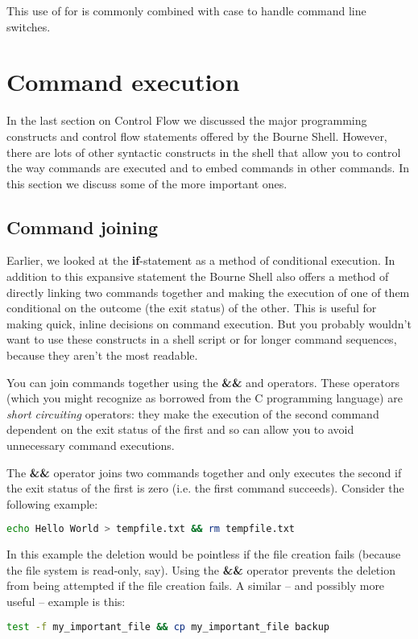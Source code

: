 This use of for is commonly combined with case to handle command line switches.

\section{Command execution}
In the last section on Control Flow we discussed the major programming
constructs and control flow statements offered by the Bourne Shell. However,
there are lots of other syntactic constructs in the shell that allow you to
control the way commands are executed and to embed commands in other commands.
In this section we discuss some of the more important ones.

\subsection{Command joining}
Earlier, we looked at the \textbf{if}-statement as a method of conditional
execution. In addition to this expansive statement the Bourne Shell also offers
a method of directly linking two commands together and making the execution of
one of them conditional on the outcome (the exit status) of the other. This is
useful for making quick, inline decisions on command execution. But you
probably wouldn't want to use these constructs in a shell script or for longer
command sequences, because they aren't the most readable.

You can join commands together using the \textbf{\&\&} and
\textbf{\textbar{}\textbar{}} operators. These operators (which you might
recognize as borrowed from the C programming language) are \emph{short
circuiting} operators: they make the execution of the second command dependent
on the exit status of the first and so can allow you to avoid unnecessary
command executions.

The \textbf{\&\&} operator joins two commands together and only executes the
second if the exit status of the first is zero (i.e. the first command
succeeds). Consider the following example:
\lstset{basicstyle=\scriptsize, numbers=left, captionpos=b, tabsize=4}
\begin{lstlisting}[caption=Attempt to create a file and delete it again if the creation succeeds,language={bash},
breaklines=true,xleftmargin=15pt,label=lst:Attempt to create a file and delete it again if the creation succeeds]
echo Hello World > tempfile.txt && rm tempfile.txt
\end{lstlisting}

In this example the deletion would be pointless if the file creation fails
(because the file system is read-only, say). Using the \textbf{\&\&} operator
prevents the deletion from being attempted if the file creation fails. A
similar -- and possibly more useful -- example is this:
\lstset{basicstyle=\scriptsize, numbers=left, captionpos=b, tabsize=4}
\begin{lstlisting}[caption=Check if a file exists and make a backup copy if it does,language={bash},
breaklines=true,xleftmargin=15pt,label=lst:Check if a file exists and make a backup copy if it does]
test -f my_important_file && cp my_important_file backup
\end{lstlisting}

